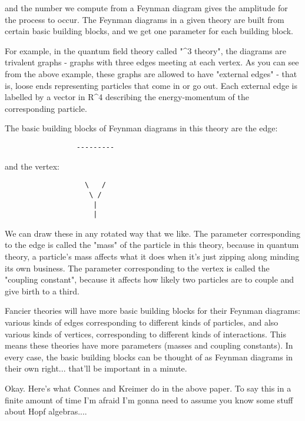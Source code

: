 and the number we compute from a Feynman diagram gives the amplitude 
for the process to occur.  The Feynman diagrams in a given theory 
are built from certain basic building blocks, and we get one parameter 
for each building block.  

For example, in the quantum field theory called "\phi ^3 theory", the 
diagrams are trivalent graphs - graphs with three edges meeting at 
each vertex.  As you can see from the above example, these graphs 
are allowed to have "external edges" - that is, loose ends representing 
particles that come in or go out.   Each external edge is labelled by a 
vector in R^4 describing the energy-momentum of the corresponding particle.  

The basic building blocks of Feynman diagrams in this theory are the
edge:


\begin{verbatim}
                 ---------

\end{verbatim}
    
and the vertex: 
                       
\begin{verbatim}
                   \   / 
                    \ /
                     |
                     |
\end{verbatim}
    
We can draw these in any rotated way that we like.  The parameter 
corresponding to the edge is called the "mass" of the particle in 
this theory, because in quantum theory, a particle's mass affects
what it does when it's just zipping along minding its own business.  
The parameter corresponding to the vertex is called the "coupling 
constant", because it affects how likely two particles are to couple 
and give birth to a third.  

Fancier theories will have more basic building blocks for their Feynman
diagrams: various kinds of edges corresponding to different kinds
of particles, and also various kinds of vertices, corresponding 
to different kinds of interactions.  This means these theories 
have more parameters (masses and coupling constants).  In every 
case, the basic building blocks can be thought of as Feynman 
diagrams in their own right... that'll be important in a minute.

Okay. Here's what Connes and Kreimer do in the above paper.  To
say this in a finite amount of time I'm afraid I'm gonna need to
assume you know some stuff about Hopf algebras....

